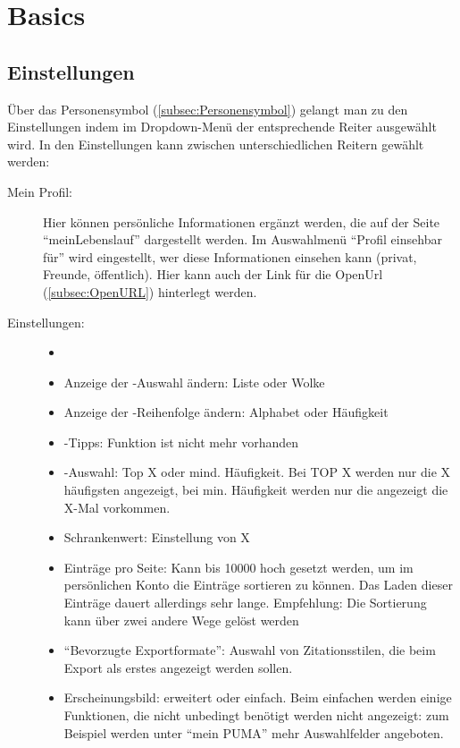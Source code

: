 \chapter{Basics}
\label{ch:basics}
\section{Einstellungen}
\label{sec:einstellungen}
Über das Personensymbol (\autoref{subsec:Personensymbol}) gelangt man zu den Einstellungen indem im Dropdown-Menü der entsprechende Reiter ausgewählt wird. In den Einstellungen kann zwischen unterschiedlichen Reitern gewählt werden:
\begin{description}
   \item[Mein Profil:]
	\item[]
Hier können persönliche Informationen ergänzt werden, die auf der Seite \enquote{meinLebenslauf} dargestellt werden. Im Auswahlmenü \enquote{Profil einsehbar für} wird eingestellt, wer diese Informationen einsehen kann (privat, Freunde, öffentlich). Hier kann auch der Link für die OpenUrl (\autoref{subsec:OpenURL}) hinterlegt werden. 
   \item[Einstellungen:] 
   \begin{itemize}
      \item[] %
      \item Anzeige der \tag-Auswahl ändern: Liste oder Wolke
      \item Anzeige der \tag-Reihenfolge ändern: Alphabet oder Häufigkeit
      \item \tag-Tipps: Funktion ist nicht mehr vorhanden
      \item \tag-Auswahl: Top X oder mind. Häufigkeit. Bei TOP X werden nur die X häufigsten \tags angezeigt, bei min. Häufigkeit werden nur die \tags angezeigt die X-Mal vorkommen.
      \item Schrankenwert: Einstellung von X
      \item Einträge pro Seite: Kann bis 10000 hoch gesetzt werden, um im persönlichen Konto die Einträge sortieren zu können. Das Laden dieser Einträge dauert allerdings sehr lange. Empfehlung: Die Sortierung kann über zwei andere Wege gelöst werden 
      \item \enquote{Bevorzugte Exportformate}: Auswahl von Zitationsstilen, die beim Export als erstes angezeigt werden sollen.
      \item Erscheinungsbild: erweitert oder einfach. Beim einfachen werden einige Funktionen, die nicht unbedingt benötigt werden nicht angezeigt: zum Beispiel werden unter \enquote{mein PUMA} mehr Auswahlfelder angeboten.

\end{itemize}
\end{description}
